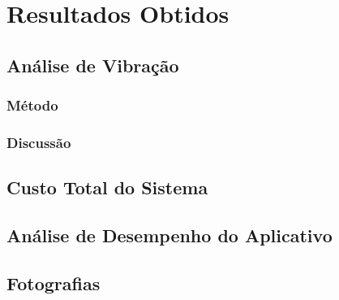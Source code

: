 \chapter{Resultados Obtidos}

\section{Análise de Vibração}
\subsection{Método}
\subsection{Discussão}

\section{Custo Total do Sistema}

\section{Análise de Desempenho do Aplicativo}

\section{Fotografias}